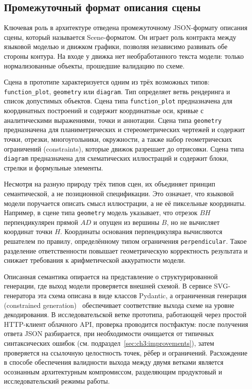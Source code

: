 \subsection{Промежуточный формат описания сцены}
\label{sec:ch3:scene}

Ключевая роль в архитектуре отведена промежуточному JSON\nobreakdash-формату описания сцены, который называется Scene\nobreakdash-форматом. Он играет роль контракта между языковой моделью и движком графики, позволяя независимо развивать обе стороны контура. На входе у движка нет необработанного текста модели: только нормализованные объекты, прошедшие валидацию по схеме.

Сцена в прототипе характеризуется одним из трёх возможных типов: \texttt{function\_plot}, \texttt{geometry} или \texttt{diagram}. Тип определяет ветвь рендеринга и список допустимых объектов. Сцена типа \texttt{function\_plot} предназначена для координатных построений и содержит координатные оси, кривые с аналитическими выражениями, точки и аннотации. Сцена типа \texttt{geometry} предназначена для планиметрических и стереометрических чертежей и содержит точки, отрезки, многоугольники, окружности, а также набор геометрических ограничений (constraints), которые движок разрешает до отрисовки. Сцена типа \texttt{diagram} предназначена для схематических иллюстраций и содержит блоки, стрелки и формульные элементы.

Несмотря на разную природу трёх типов сцен, их объединяет принцип семантической, а не позиционной спецификации. Это означает, что языковой модели поручается описать смысл иллюстрации, а не её пиксельные координаты. Например, в сцене типа \texttt{geometry} модель указывает, что отрезок \(BH\) перпендикулярен прямой \(AD\) и опущен из вершины \(B\), но не вычисляет координат точки \(H\). Координаты основания перпендикуляра вычисляются решателем по правилу, определённому типом ограничения \texttt{perpendicular}. Такое разделение ответственности повышает геометрическую корректность результата и снижает требования к арифметической аккуратности модели.

Описанная семантика опирается на представление о структурированной генерации, где выход модели проверяется внешней схемой. В сервисе SVG\nobreakdash-генератора эта схема описана в виде классов Pydantic, а ограниченная генерация (constrained generation)~\cite{Willard2023Outlines} обеспечивает соответствие выхода схеме на уровне декодирования. В исследовательской ветке прототипа, работающей через простой HTTP\nobreakdash-клиент облачного API, проверка проводится постфактум: после получения ответа JSON разбирается, при необходимости очищается от типичных синтаксических ошибок (см. подраздел~\ref{sec:ch3:improvements}), затем проверяется на ссылочную целостность точек, рёбер и ограничений. Расхождение в способе обеспечения валидности выхода между двумя ветками является осознанным архитектурным компромиссом, разделяющим продуктовый и исследовательский режимы работы.

